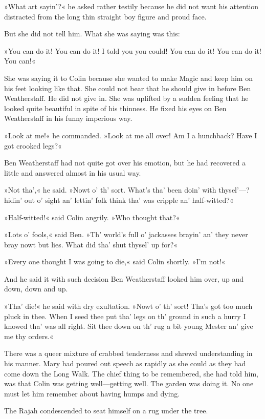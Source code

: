 »What art sayin'?« he asked rather testily because he did not want his attention distracted from the long thin straight boy figure and proud face.

But she did not tell him. What she was saying was this:

»You can do it! You can do it! I told you you could! You can do it! You can do it! You can!«

She was saying it to Colin because she wanted to make Magic and keep him on his feet looking like that. She could not bear that he should give in before Ben Weatherstaff. He did not give in. She was uplifted by a sudden feeling that he looked quite beautiful in spite of his thinness. He fixed his eyes on Ben Weatherstaff in his funny imperious way.

»Look at me!« he commanded. »Look at me all over! Am I a hunchback? Have I got crooked legs?«

Ben Weatherstaff had not quite got over his emotion, but he had recovered a little and answered almost in his usual way.

»Not tha',« he said. »Nowt o' th' sort. What's tha' been doin' with thysel'—? hidin' out o' sight an' lettin' folk think tha' was cripple an' half-witted?«

»Half-witted!« said Colin angrily. »Who thought that?«

»Lots o' fools,« said Ben. »Th' world's full o' jackasses brayin' an' they never bray nowt but lies. What did tha' shut thysel' up for?«

»Every one thought I was going to die,« said Colin shortly. »I'm not!«

And he said it with such decision Ben Weatherstaff looked him over, up and down, down and up.

»Tha' die!« he said with dry exultation. »Nowt o' th' sort! Tha's got too much pluck in thee. When I seed thee put tha' legs on th' ground in such a hurry I knowed tha' was all right. Sit thee down on th' rug a bit young Mester an' give me thy orders.«

There was a queer mixture of crabbed tenderness and shrewd understanding in his manner. Mary had poured out speech as rapidly as she could as they had come down the Long Walk. The chief thing to be remembered, she had told him, was that Colin was getting well—getting well. The garden was doing it. No one must let him remember about having humps and dying.

The Rajah condescended to seat himself on a rug under the tree.

